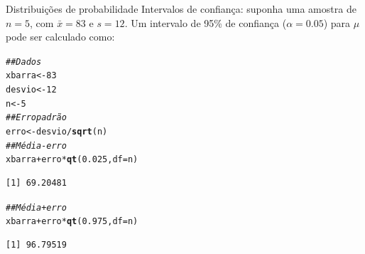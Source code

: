 \documentclass[10pt]{beamer}\usepackage[]{graphicx}\usepackage[]{color}
\makeatletter
\newcommand{\hlnum}[1]{\textcolor[rgb]{0.686,0.059,0.569}{#1}}%
\newcommand{\hlcom}[1]{\textcolor[rgb]{0.678,0.584,0.686}{\textit{#1}}}%
\newcommand{\hlopt}[1]{\textcolor[rgb]{0,0,0}{#1}}%
\newcommand{\hlstd}[1]{\textcolor[rgb]{0.345,0.345,0.345}{#1}}%
\newcommand{\hlkwb}[1]{\textcolor[rgb]{0.69,0.353,0.396}{#1}}%
\newcommand{\hlkwc}[1]{\textcolor[rgb]{0.333,0.667,0.333}{#1}}%
\newcommand{\hlkwd}[1]{\textcolor[rgb]{0.737,0.353,0.396}{\textbf{#1}}}%
\newenvironment{kframe}{%
 \def\at@end@of@kframe{}%
 \ifinner\ifhmode%
  \def\at@end@of@kframe{\end{minipage}}%
  \begin{minipage}{\columnwidth}%
 \fi\fi%
 \def\FrameCommand##1{\hskip\@totalleftmargin \hskip-\fboxsep
 \colorbox{shadecolor}{##1}\hskip-\fboxsep
     \hskip-\linewidth \hskip-\@totalleftmargin \hskip\columnwidth}%
 \MakeFramed {\advance\hsize-\width
   \@totalleftmargin\z@ \linewidth\hsize
   \@setminipage}}%
 {\par\unskip\endMakeFramed%
 \at@end@of@kframe}
\newenvironment{knitrout}{}{} %
\theoremstyle{definition}
\makeatother
\begin{document}
\begin{frame}[fragile=singleslide]{Distribuições de probabilidade}
Intervalos de confiança: suponha uma amostra de $n=5$, com $\bar{x}=83$
e $s=12$. Um intervalo de 95\% de confiança ($\alpha = 0.05$) para $\mu$
pode ser calculado como:
\begin{knitrout}\small
{}\color{fgcolor}\begin{kframe}
\begin{alltt}
\hlcom{## Dados}
\hlstd{xbarra} \hlkwb{<-} \hlnum{83}
\hlstd{desvio} \hlkwb{<-} \hlnum{12}
\hlstd{n} \hlkwb{<-} \hlnum{5}
\hlcom{## Erro padrão}
\hlstd{erro} \hlkwb{<-} \hlstd{desvio}\hlopt{/}\hlkwd{sqrt}\hlstd{(n)}
\hlcom{## Média - erro}
\hlstd{xbarra} \hlopt{+} \hlstd{erro} \hlopt{*} \hlkwd{qt}\hlstd{(}\hlnum{0.025}\hlstd{,} \hlkwc{df} \hlstd{= n)}
\end{alltt}
\begin{verbatim}
[1] 69.20481
\end{verbatim}
\begin{alltt}
\hlcom{## Média + erro}
\hlstd{xbarra} \hlopt{+} \hlstd{erro} \hlopt{*} \hlkwd{qt}\hlstd{(}\hlnum{0.975}\hlstd{,} \hlkwc{df} \hlstd{= n)}
\end{alltt}
\begin{verbatim}
[1] 96.79519
\end{verbatim}
\end{kframe}
\end{knitrout}
\end{frame}
\end{document}

